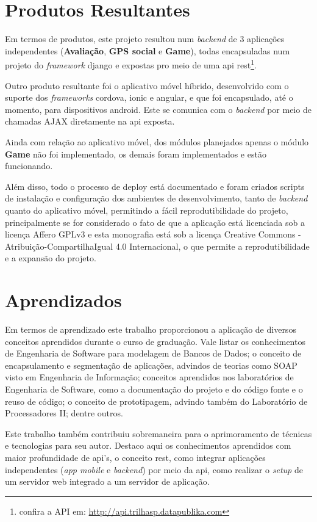 \section{Produtos Resultantes}
Em termos de produtos, este projeto resultou num \textit{backend} de 3 aplicações independentes (\textbf{Avaliação}, \textbf{GPS social} e \textbf{Game}), todas encapsuladas num projeto do \textit{framework} \gls{django} e expostas pro meio de uma \gls{api} \gls{rest}\footnote{confira a API em: \url{http://api.trilhasp.datapublika.com}}.

Outro produto resultante foi o aplicativo móvel híbrido, desenvolvido com o suporte dos \textit{frameworks} \gls{cordova}, \gls{ionic} e \gls{angular}, e que foi encapsulado, até o momento, para dispositivos \gls{android}. Este se comunica com o \textit{backend} por meio de chamadas AJAX diretamente na \gls{api} exposta.

Ainda com relação ao aplicativo móvel, dos módulos planejados apenas o módulo \textbf{Game} não foi implementado, os demais foram implementados e estão funcionando.

Além disso, todo o processo de deploy está documentado e foram criados scripts de instalação e configuração dos ambientes de desenvolvimento, tanto de \textit{backend} quanto do aplicativo móvel, permitindo a fácil reprodutibilidade do projeto, principalmente se for considerado o fato de que a aplicação está licenciada sob a licença Affero GPLv3 e esta monografia está sob a licença Creative Commons - Atribuição-CompartilhaIgual 4.0 Internacional, o que permite a reprodutibilidade e a expansão do projeto.

\section{Aprendizados}
Em termos de aprendizado este trabalho proporcionou a aplicação de diversos conceitos aprendidos durante o curso de graduação. Vale listar os conhecimentos de Engenharia de Software para modelagem de Bancos de Dados; o conceito de encapsulamento e segmentação de aplicações, advindos de teorias como SOAP visto em Engenharia de Informação; conceitos aprendidos nos laboratórios de Engenharia de Software, como a documentação do projeto e do código fonte e o reuso de código; o conceito de prototipagem, advindo também do Laboratório de Processadores II; dentre outros.

Este trabalho também contribuiu sobremaneira para o aprimoramento de técnicas e tecnologias para seu autor. Destaco aqui os conhecimentos aprendidos com maior profundidade de \gls{api}'s, o conceito \gls{rest}, como integrar aplicações independentes (\textit{app mobile} e \textit{backend}) por meio da \gls{api}, como realizar o \textit{setup} de um servidor web integrado a um servidor de aplicação.

